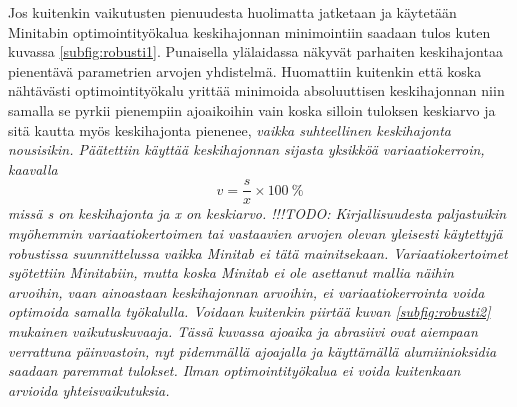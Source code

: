 \documentclass[12pt,a4paper,finnish]{tutthesis}
\newcommand\todo[1]{{\color{red}!!!TODO: #1}} %
\begin{document}
Jos kuitenkin vaikutusten pienuudesta huolimatta
jatketaan ja käytetään Minitabin optimointityökalua keskihajonnan minimointiin
saadaan tulos kuten kuvassa \ref{subfig:robusti1}.
Punaisella ylälaidassa näkyvät parhaiten keskihajontaa pienentävä parametrien arvojen yhdistelmä. Huomattiin kuitenkin että koska nähtävästi
optimointityökalu yrittää minimoida absoluuttisen keskihajonnan niin samalla se
pyrkii pienempiin ajoaikoihin vain koska silloin tuloksen keskiarvo ja sitä kautta myös keskihajonta pienenee, \em vaikka suhteellinen keskihajonta nousisikin. \em Päätettiin käyttää keskihajonnan sijasta yksikköä \em variaatiokerroin, \em kaavalla
\[v = \frac{s}{x} \times 100\> \%\]
missä \em s \em on keskihajonta ja \em x \em on keskiarvo.
\todo{Kirjallisuudesta paljastuikin myöhemmin variaatiokertoimen tai vastaavien arvojen olevan yleisesti käytettyjä robustissa suunnittelussa vaikka Minitab ei tätä mainitsekaan.}
Variaatiokertoimet syötettiin Minitabiin, mutta koska Minitab ei ole asettanut mallia näihin arvoihin, vaan ainoastaan keskihajonnan arvoihin, ei variaatiokerrointa voida optimoida samalla työkalulla. Voidaan kuitenkin piirtää kuvan \ref{subfig:robusti2} mukainen vaikutuskuvaaja.
Tässä kuvassa ajoaika ja abrasiivi ovat aiempaan verrattuna päinvastoin, nyt pidemmällä ajoajalla ja käyttämällä alumiinioksidia saadaan paremmat tulokset. Ilman optimointityökalua ei voida kuitenkaan arvioida yhteisvaikutuksia.
\end{document}
